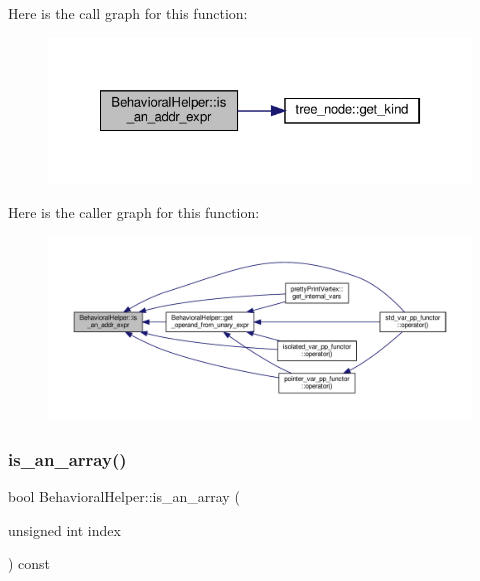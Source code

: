 Here is the call graph for this function\+:
\nopagebreak
\begin{figure}[H]
\begin{center}
\leavevmode
\includegraphics[width=322pt]{dd/db2/classBehavioralHelper_a4127bd7bc6af18101f77ac5f68d6af60_cgraph}
\end{center}
\end{figure}
Here is the caller graph for this function\+:
\nopagebreak
\begin{figure}[H]
\begin{center}
\leavevmode
\includegraphics[width=350pt]{dd/db2/classBehavioralHelper_a4127bd7bc6af18101f77ac5f68d6af60_icgraph}
\end{center}
\end{figure}
\mbox{\label{classBehavioralHelper_ac060a3b1575371be4bc553b158cdd5da}} 
\subsubsection{\texorpdfstring{is\+\_\+an\+\_\+array()}{is\_an\_array()}}
{\footnotesize\ttfamily bool Behavioral\+Helper\+::is\+\_\+an\+\_\+array (\begin{DoxyParamCaption}\item[{unsigned int}]{index }\end{DoxyParamCaption}) const\hspace{0.3cm}{\ttfamily [virtual]}}



